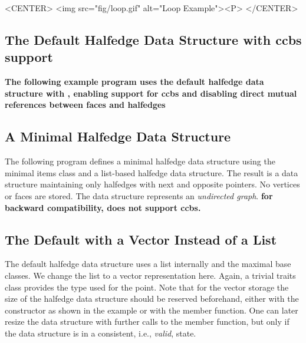 \begin{ccHtmlOnly}
    <CENTER>
      <img src="fig/loop.gif" alt="Loop Example"><P>
    </CENTER>
\end{ccHtmlOnly}



\subsection{The Default Halfedge Data Structure with ccbs support}

{\bf\ttfamily
The following example program uses the default halfedge data structure
with , enabling support for
ccbs and disabling direct mutual references between faces and halfedges
}


\subsection{A Minimal Halfedge Data Structure}

The following program defines a minimal halfedge data structure using
the minimal items class  and a
list-based halfedge data structure. The result is a data structure
maintaining only halfedges with next and opposite pointers.  No
vertices or faces are stored. The data structure represents an {\em
  undirected graph}.
{\bf\ttfamily for backward compatibility, 
 does not support ccbs.}


\subsection{The Default with a Vector Instead of a List}

The default halfedge data structure uses a list internally and the
maximal base classes. We change the list to a vector representation
here. Again, a trivial traits class provides the type used for the
point.  Note that for the vector storage the size of the halfedge data
structure should be reserved beforehand, either with the constructor
as shown in the example or with the  member function.
One can later resize the data structure with further calls to the
 member function, but only if the data structure is 
in a consistent, i.e., {\em valid}, state.

